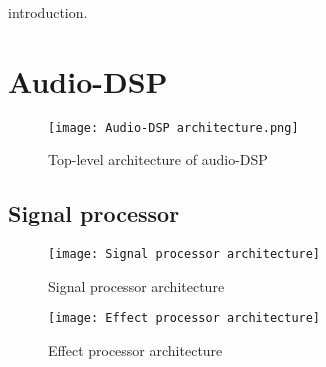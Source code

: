 introduction.

\section{Audio-DSP}
\begin{figure}[h]
    \texttt{[image: Audio-DSP architecture.png]}\\    
    \caption{Top-level architecture of audio-DSP}
    \label{fig:arch-top}
\end{figure}



\subsection{Signal processor}
\begin{figure}[h]
    \texttt{[image: Signal processor architecture]}
    \caption{Signal processor architecture}
    \label{fig:arch-signal-processor}
\end{figure}



\begin{figure}[h]
    \texttt{[image: Effect processor architecture]}
    \caption{Effect processor architecture}
    \label{fig:arch-effect-processor}
\end{figure}
